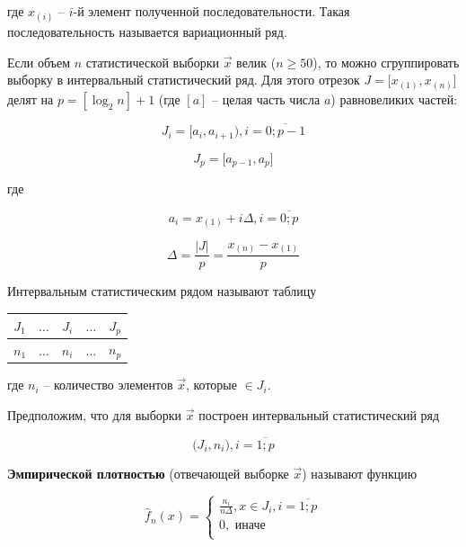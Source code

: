 где $x_{(i)}$ -- $i$-й элемент полученной последовательности. Такая последовательность называется вариационный ряд.

Если объем $n$ статистической выборки $\vec x$ велик ($n \geq 50$), то можно сгруппировать выборку в интервальный статистический ряд. Для этого отрезок $J = \big[ x_{(1)}, x_{(n)} \big]$ делят на $p = [\log_2n] + 1$ (где $[a]$ -- целая часть числа $a$) равновеликих частей:

\begin{equation*}
    J_i = \big[ a_i, a_{i+1} \big), i = \overline{0; p-1}
\end{equation*}

\begin{equation*}
    J_p = \big[ a_{p-1}, a_p \big]
\end{equation*}

где

\begin{equation*}
    a_i = x_{(1)} + i\Delta, i = \overline{0;p}
\end{equation*}

\begin{equation*}
    \Delta = \frac{|J|}{p} = \frac{x_{(n)} - x_{(1)}}{p}
\end{equation*}

Интервальным статистическим рядом называют таблицу

\begin{table}[H]
    \centering
    \begin{tabular}{|c|c|c|c|c|}
        \hline
        $J_1$ & $\dots$ & $J_i$ & $\dots$ & $J_p$ \\
        \hline
        $n_1$ & $\dots$ & $n_i$ & $\dots$ & $n_p$ \\
        \hline
    \end{tabular}
\end{table}

где $n_i$ -- количество элементов $\vec x$, которые $\in J_i$.

Предположим, что для выборки $\vec x$ построен интервальный статистический
ряд

\begin{equation*}
    \big( J_i, n_i \big), i = \overline{1; p}
\end{equation*}

\textbf{Эмпирической плотностью}
(отвечающей выборке $\vec x$) называют функцию

\begin{equation*}
    \hat f_n(x) =
    \begin{cases}
        \frac{n_i}{n \Delta}, x \in J_i, i = \overline{1; p} \\
        0, \text{ иначе} \\
    \end{cases}
\end{equation*}

